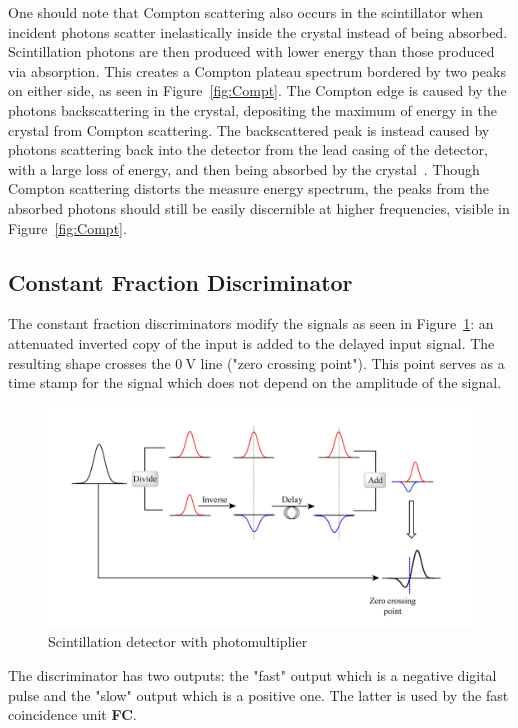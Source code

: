 \documentclass[twocolumn]{article}
\begin{document}
\par One should note that Compton scattering also occurs in the scintillator when incident photons scatter inelastically inside the crystal instead of being absorbed. Scintillation photons are then produced with lower energy than those produced via absorption. This creates a Compton plateau spectrum bordered by two peaks on either side, as seen in Figure~\ref{fig:Compt}. The Compton edge is caused by the photons backscattering in the crystal, depositing the maximum of energy in the crystal from Compton scattering. The backscattered peak is instead caused by photons scattering back into the detector from the lead casing of the detector, with a large loss of energy, and then being absorbed by the crystal~\cite{Compton}. Though Compton scattering distorts the measure energy spectrum, the peaks from the absorbed photons should still be easily discernible at higher frequencies, visible in Figure~\ref{fig:Compt}.


\subsection{Constant Fraction Discriminator}
The constant fraction discriminators modify the signals as seen in Figure~\ref{fig:cfd}: an attenuated inverted copy of the input is added to the delayed input signal. The resulting shape crosses the $\SI{0}{\volt}$ line ("zero crossing point"). This point serves as a time stamp for the signal which does not depend on the amplitude of the signal.
\begin{figure}[!h]
	\centering
	\includegraphics[width=1.02\linewidth]{cfd.png}
	\caption{Scintillation detector with photomultiplier \cite{cfd}} 
	\label{fig:cfd}
\end{figure}
The discriminator has two outputs: the "fast" output which is a negative digital pulse and the "slow" output which is a positive one. The latter is used by the fast coincidence unit \textbf{FC}.
\end{document}
